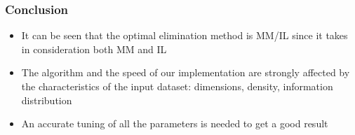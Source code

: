 \documentclass{beamer}
\begin{document}
\begin{frame}[fragile]
\frametitle{Conclusion}
\begin{itemize}
    \item It can be seen that the optimal elimination method is MM/IL since it takes in consideration both MM and IL
    \item The algorithm and the speed of our implementation are strongly affected by the characteristics of the input dataset: dimensions, density, information distribution
    \item An accurate tuning of all the parameters is needed to get a good result
\end{itemize}
\end{frame}
\end{document}
